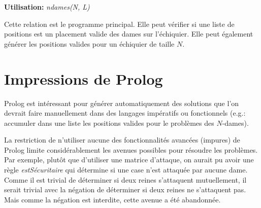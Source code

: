 \documentclass[10pt]{article}
\newcommand{\usage}[1]{\textbf{Utilisation: }\emph{#1}}
\begin{document}
\usage{ndames(N, L)}

Cette relation est le programme principal. Elle peut vérifier si une
liste de positions est un placement valide des dames sur l'échiquier.
Elle peut également générer les positions valides pour un échiquier de
taille $N$.


\section{Impressions de Prolog}

Prolog est intéressant pour générer automatiquement des solutions que
l'on devrait faire manuellement dans des langages impératifs ou
fonctionnels (e.g.: accumuler dans une liste les positions valides
pour le problèmes des $N$-dames).

La restriction de n'utiliser aucune des fonctionnalités avancées
(impures) de Prolog limite considérablement les avenues possibles pour
résoudre les problèmes. Par exemple, plutôt que d'utiliser une
matrice d'attaque, on aurait pu avoir une règle \emph{estSécuritaire}
qui détermine si une case n'est attaquée par aucune dame. Comme il
est trivial de déterminer si deux reines s'attaquent mutuellement, il
serait trivial avec la négation de déterminer si deux reines ne
s'attaquent pas. Mais comme la négation est interdite, cette avenue a
été abandonnée.
\end{document}
